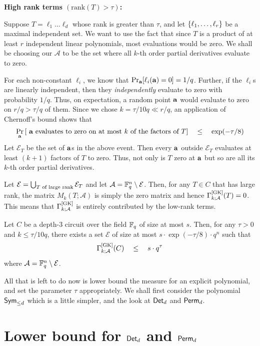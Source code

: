 \noindent
{\bf High rank terms $(\mathrm{rank}(T) > \tau)$:}

Suppose $T = \ell_1\dots \ell_d$ whose rank is greater than $\tau$, and let $\left\{\ell_1, \dots, \ell_r\right\}$ be a maximal
independent set. 
We want to use the fact that since $T$ is a product
of at least $r$ independent linear polynomials, most evaluations would
be zero. 
We shall be choosing our $\mathcal{A}$ to be the set where
all $k$-th order partial derivatives evaluate to zero.

For each non-constant $\ell_i$, we know that $\Pr_{\mathbf{a}} [\ell_i(\mathbf{a}) = 0]  =  1/q$. 
Further, if the $\ell_i$s are linearly independent, then they \emph{independently} evaluate to zero with probability $1/q$. 
Thus, on expectation, a random point $\mathbf{a}$ would evaluate to zero on $r/q > \tau/q$ of them. 
Since we chose $k = \tau/10q \ll r/q$, an application of Chernoff's bound shows that 
\[
\Pr_{\mathbf{a}}\left[\text{ $\mathbf{a}$ evaluates to zero on at most $k$ of the factors of $T$}\right] \quad \leq \quad \exp(-\tau/8)
\]
Let $\mathcal{E}_T$ be the set of $\mathbf{a}$s in the above event. Then every $\mathbf{a}$ outside $\mathcal{E}_T$ evaluates at least $(k+1)$ factors of $T$ to zero. 
Thus, not only is $T$ zero at $\mathbf{a}$ but so are all its $k$-th order partial derivatives. 

Let $\mathcal{E}  = \bigcup_{T\text{ of large rank}} \mathcal{E}_T$ and let $\mathcal{A} = \mathbb{F}_q^n \setminus \mathcal{E}$. 
Then, for any $T\in C$ that has large rank, the matrix $M_k(T;\mathcal{A})$ is simply the zero matrix and hence $\Gamma^{\mathrm{[GK]}}_{k;\mathcal{A}}(T) = 0$. 
This means that $\Gamma^{\mathrm{[GK]}}_{k;\mathcal{A}}$ is entirely contributed by the low-rank terms. 

\begin{lemma}\label{lem:GK-upper-bound}
Let $C$ be a depth-$3$ circuit over the field $\mathbb{F}_q$ of size at most $s$. Then, for any $\tau > 0$ and $k \leq \tau/10q$, there exists a set $\mathcal{E}$ of size at most $s \cdot \exp(-\tau/8) \cdot q^n$ such that 
\[
\Gamma^{\mathrm{[GK]}}_{k;\mathcal{A}}(C) \quad \leq \quad s \cdot q^{\tau}
\]
where $\mathcal{A} = \mathbb{F}_q^n \setminus \mathcal{E}$. 
\end{lemma}

All that is left to do now is lower bound the measure for an explicit polynomial, and set the parameter $\tau$ appropriately. We shall first consider the polynomial $\operatorname{\mathsf{Sym}}_{\leq d}$ which is a little simpler, and the look at $\operatorname{\mathsf{Det}}_d$ and $\operatorname{\mathsf{Perm}}_d$. 

\section{Lower bound for $\operatorname{\mathsf{Det}}_d$ and $\operatorname{\mathsf{Perm}}_d$}

